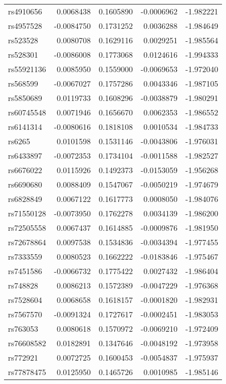 \documentclass[
]{article}
\theoremstyle{plain}
\begin{document}
{\begin{longtable}[t]{lrrrr}
rs4910656 & 0.0068438 & 0.1605890 & -0.0006962 & -1.982221\\
rs4957528 & -0.0084750 & 0.1731252 & 0.0036288 & -1.984649\\
rs523528 & 0.0080708 & 0.1629116 & 0.0029251 & -1.985564\\
rs528301 & -0.0086008 & 0.1773068 & 0.0124616 & -1.994333\\
rs55921136 & 0.0085950 & 0.1559000 & -0.0069653 & -1.972040\\
\addlinespace
rs568599 & -0.0067027 & 0.1757286 & 0.0043346 & -1.987105\\
rs5850689 & 0.0119733 & 0.1608296 & -0.0038879 & -1.980291\\
rs60745548 & 0.0071946 & 0.1656670 & 0.0062353 & -1.986552\\
rs6141314 & -0.0080616 & 0.1818108 & 0.0010534 & -1.984733\\
rs6265 & 0.0101598 & 0.1531146 & -0.0043806 & -1.976031\\
\addlinespace
rs6433897 & -0.0072353 & 0.1734104 & -0.0011588 & -1.982527\\
rs6676022 & 0.0115926 & 0.1492373 & -0.0153059 & -1.956268\\
rs6690680 & 0.0088409 & 0.1547067 & -0.0050219 & -1.974679\\
rs6828849 & 0.0067122 & 0.1617773 & 0.0008050 & -1.984076\\
rs71550128 & -0.0073950 & 0.1762278 & 0.0034139 & -1.986200\\
\addlinespace
rs72505558 & 0.0067437 & 0.1614885 & -0.0009876 & -1.981950\\
rs72678864 & 0.0097538 & 0.1534836 & -0.0034394 & -1.977455\\
rs7333559 & 0.0080523 & 0.1662222 & -0.0183846 & -1.975467\\
rs7451586 & -0.0066732 & 0.1775422 & 0.0027432 & -1.986404\\
rs748828 & 0.0086213 & 0.1572389 & -0.0047229 & -1.976368\\
\addlinespace
rs7528604 & 0.0068658 & 0.1618157 & -0.0001820 & -1.982931\\
rs7567570 & -0.0091324 & 0.1727617 & -0.0002451 & -1.983053\\
rs763053 & 0.0080618 & 0.1570972 & -0.0069210 & -1.972409\\
rs76608582 & 0.0182891 & 0.1347646 & -0.0048192 & -1.973958\\
rs772921 & 0.0072725 & 0.1600453 & -0.0054837 & -1.975937\\
\addlinespace
rs77878475 & 0.0125950 & 0.1465726 & 0.0010985 & -1.985146\\

\end{longtable}}
\end{document}
